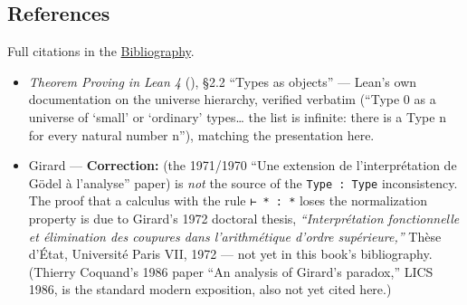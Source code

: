 \subsection{References}\label{sec:05-rigor-check:02-universes:5}

Full citations in the \hyperref[sec:root:bibliography:1]{Bibliography}.

\begin{itemize}
\tightlist
\item
  \emph{Theorem Proving in Lean 4} (\cite{TPIL4}), §2.2 ``Types as objects'' --- Lean's own documentation on the universe hierarchy, verified verbatim (``Type 0 as a universe of `small' or `ordinary' types\ldots{} the list is infinite: there is a Type n for every natural number n''), matching the presentation here.
\item
  Girard --- \textbf{Correction:} \cite{Girard1971} (the 1971/1970 ``Une extension de l'interprétation de Gödel à l'analyse'' paper) is \emph{not} the source of the \texttt{Type : Type} inconsistency. The proof that a calculus with the rule \texttt{⊢ * : *} loses the normalization property is due to Girard's 1972 doctoral thesis, \emph{``Interprétation fonctionnelle et élimination des coupures dans l'arithmétique d'ordre supérieure,''} Thèse d'État, Université Paris VII, 1972 --- not yet in this book's bibliography. (Thierry Coquand's 1986 paper ``An analysis of Girard's paradox,'' LICS 1986, is the standard modern exposition, also not yet cited here.)
\end{itemize}
